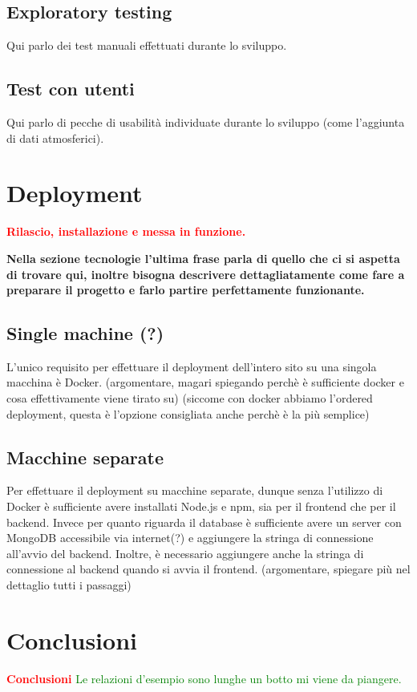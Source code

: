 \documentclass{article}
\begin{document}
\subsection{Exploratory testing}
Qui parlo dei test manuali effettuati durante lo sviluppo.
\subsection{Test con utenti}
Qui parlo di pecche di usabilità individuate durante lo sviluppo (come l'aggiunta di dati atmosferici).

\section{Deployment}\label{sec:deployment}
\textcolor{red}{\textbf{Rilascio, installazione e messa in funzione.}}

\textbf{Nella sezione tecnologie l'ultima frase parla di quello che ci si aspetta di trovare qui, inoltre bisogna descrivere dettagliatamente come fare a preparare il progetto e farlo partire perfettamente funzionante.}

\subsection{Single machine (?)}
L'unico requisito per effettuare il deployment dell'intero sito su una singola macchina è Docker. (argomentare, magari spiegando perchè è sufficiente docker e cosa effettivamente viene tirato su)
(siccome con docker abbiamo l'ordered deployment, questa è l'opzione consigliata anche perchè è la più semplice)

\subsection{Macchine separate}
Per effettuare il deployment su macchine separate, dunque senza l'utilizzo di Docker è sufficiente avere installati Node.js e npm, sia per il frontend che per il backend. Invece per quanto riguarda il database è sufficiente avere un server con MongoDB accessibile via internet(?) e aggiungere la stringa di connessione all'avvio del backend. Inoltre, è necessario aggiungere anche la stringa di connessione al backend quando si avvia il frontend.
(argomentare, spiegare più nel dettaglio tutti i passaggi)

\section{Conclusioni}
\textcolor{red}{\textbf{Conclusioni}}
\textcolor{green}{Le relazioni d'esempio sono lunghe un botto mi viene da piangere.}



\end{document}
